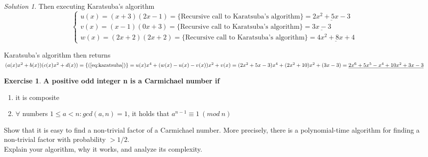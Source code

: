 \documentclass[a4paper,twoside=false,abstract=false,numbers=noenddot,
titlepage=false,headings=small,parskip=half,version=last]{scrartcl}
\theoremstyle{definition}
\newtheorem{exercise}{Exercise}
\theoremstyle{remark}
\newtheorem*{solution}{Solution}
\begin{document}
\begin{solution}
Then executing Karatsuba's algorithm
\begin{equation*}
    \begin{cases}
        u(x) = (x+3)(2x-1)=\{\mbox{Recursive call to Karatsuba's algorithm}\} =
        \underline{2x^2+5x-3} \\
        v(x) = (x-1)(0x+3)= \{\mbox{Recursive call to Karatsuba's algorithm}\}
        =\underline{3x-3} \\ 
        w(x) = (2x+2)(2x+2)=\{\mbox{Recursive call to Karatsuba's algorithm}\} =
        \underline{4x^2+8x+4}
    \end{cases}
\end{equation*}

Karatsuba's algorithm then returns\\
    $(a(x)x^2+b(x))(c(x)x^2+d(x))= \{(\ref{eq:karatsuba})\}
    = u(x)x^4+(w(x)-u(x)-v(x))x^2+v(x) \\
    = (2x^2+5x-3)x^4+(2x^2+10)x^2+(3x-3) =\underline{2x^6+5x^5-x^4+10x^2+3x-3}$

\end{solution}
\begin{exercise}
{\bf
A positive odd integer n is a Carmichael number if
\begin{enumerate}
\item
it is composite
\item
$\forall$ numbers $1 \le a < n : gcd(a,n)=1$, it holds that $a^{n-1}\equiv 1
    \ (mod\ n)$
\end{enumerate}
Show that it is easy to find a non-trivial factor of a Carmichael number. More
precisely, there is a polynomial-time algorithm for finding a non-trivial
factor with probability $> 1/2$.\\
Explain your algorithm, why it works, and analyze its complexity.
}
\end{exercise}
\end{document}
